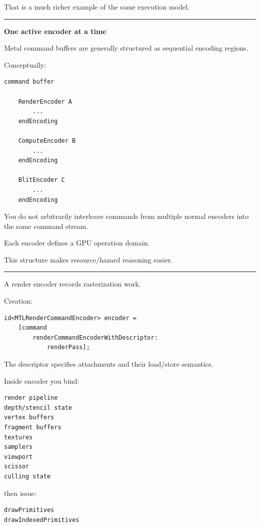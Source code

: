 That is a much richer example of the same execution model.

\begin{center}\rule{0.5\linewidth}{0.5pt}\end{center}

\textbf{One active encoder at a time}

Metal command buffers are generally structured as sequential encoding regions.

Conceptually:

\begin{verbatim}
command buffer

    RenderEncoder A
        ...
    endEncoding

    ComputeEncoder B
        ...
    endEncoding

    BlitEncoder C
        ...
    endEncoding
\end{verbatim}

You do not arbitrarily interleave commands from multiple normal encoders into the same command stream.

Each encoder defines a GPU operation domain.

This structure makes resource/hazard reasoning easier.

\begin{center}\rule{0.5\linewidth}{0.5pt}\end{center}

\textbf{}

A render encoder records rasterization work.

Creation:

\begin{verbatim}
id<MTLRenderCommandEncoder> encoder =
    [command
        renderCommandEncoderWithDescriptor:
            renderPass];
\end{verbatim}

The descriptor specifies attachments and their load/store semantics.

Inside encoder you bind:

\begin{verbatim}
render pipeline
depth/stencil state
vertex buffers
fragment buffers
textures
samplers
viewport
scissor
culling state
\end{verbatim}

then issue:

\begin{verbatim}
drawPrimitives
drawIndexedPrimitives
\end{verbatim}

